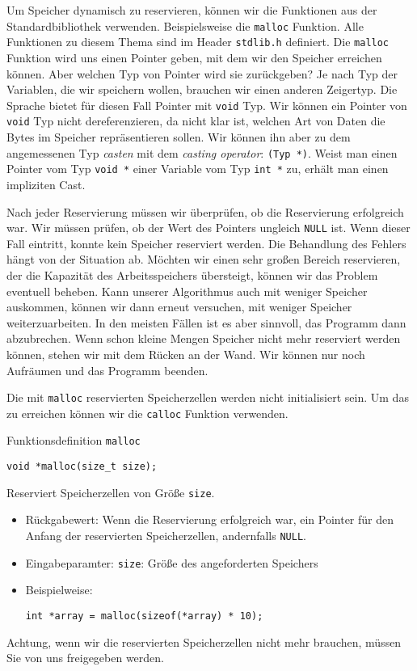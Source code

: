 Um Speicher dynamisch zu reservieren, können wir die Funktionen aus der
Standardbibliothek verwenden. Beispielsweise die \texttt{malloc} Funktion. Alle
Funktionen zu diesem Thema sind im Header \texttt{stdlib.h} definiert. Die
\texttt{malloc} Funktion wird uns einen Pointer geben, mit dem wir den Speicher
erreichen können. Aber welchen Typ von Pointer wird sie zurückgeben? Je nach
Typ der Variablen, die wir speichern wollen, brauchen wir einen anderen
Zeigertyp. Die Sprache bietet für diesen Fall Pointer mit \texttt{void} Typ.
Wir können ein Pointer von \texttt{void} Typ nicht dereferenzieren, da nicht
klar ist, welchen Art von Daten die Bytes im Speicher repräsentieren sollen.
Wir können ihn aber zu dem angemessenen Typ \emph{casten} mit dem \emph{casting
operator}: \texttt{(Typ *)}. Weist man einen Pointer vom Typ \texttt{void *}
einer Variable vom Typ \texttt{int *} zu, erhält man einen impliziten Cast.

Nach jeder Reservierung müssen wir überprüfen, ob die Reservierung erfolgreich
war. Wir müssen prüfen, ob der Wert des Pointers ungleich \texttt{NULL} ist. Wenn dieser Fall eintritt, konnte kein Speicher reserviert werden. Die Behandlung des Fehlers hängt von der Situation ab. Möchten wir einen sehr großen Bereich reservieren, der die Kapazität des Arbeitsspeichers übersteigt, können wir das Problem eventuell beheben. Kann unserer Algorithmus auch mit weniger Speicher auskommen, können wir dann erneut versuchen, mit weniger Speicher weiterzuarbeiten. In den meisten Fällen ist es aber sinnvoll, das Programm dann abzubrechen. Wenn schon kleine Mengen Speicher nicht mehr reserviert werden können, stehen wir mit dem Rücken an der Wand. Wir können nur noch Aufräumen und das Programm beenden.

Die mit \texttt{malloc} reservierten Speicherzellen werden nicht initialisiert
sein. Um das zu erreichen können wir die \texttt{calloc} Funktion verwenden.

\begin{myexampleblock}{Funktionsdefinition \texttt{malloc}}
\begin{lstlisting}
void *malloc(size_t size);
\end{lstlisting}
\vspace{-0.7cm}
Reserviert Speicherzellen von Größe \texttt{size}.
\begin{itemize}
\itemsep0.2pt
\item Rückgabewert: Wenn die Reservierung erfolgreich war, ein Pointer für den Anfang der 
reservierten Speicherzellen, andernfalls \texttt{NULL}.
\item Eingabeparamter: \texttt{size}: Größe des angeforderten Speichers
\item Beispielweise:
\begin{lstlisting}
int *array = malloc(sizeof(*array) * 10);
\end{lstlisting}
\end{itemize}

Achtung, wenn wir die reservierten Speicherzellen nicht mehr brauchen, müssen
Sie von uns freigegeben werden.
\end{myexampleblock}

